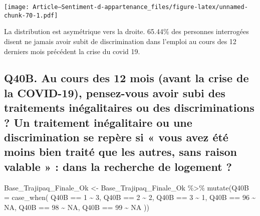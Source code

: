\documentclass[
]{article}
\newenvironment{Shaded}{\begin{snugshade}}{\end{snugshade}}
\newcommand{\AttributeTok}[1]{\textcolor[rgb]{0.77,0.63,0.00}{#1}}
\newcommand{\ConstantTok}[1]{\textcolor[rgb]{0.00,0.00,0.00}{#1}}
\newcommand{\DecValTok}[1]{\textcolor[rgb]{0.00,0.00,0.81}{#1}}
\newcommand{\FunctionTok}[1]{\textcolor[rgb]{0.00,0.00,0.00}{#1}}
\newcommand{\NormalTok}[1]{#1}
\newcommand{\OtherTok}[1]{\textcolor[rgb]{0.56,0.35,0.01}{#1}}
\newcommand{\SpecialCharTok}[1]{\textcolor[rgb]{0.00,0.00,0.00}{#1}}
\begin{document}
\texttt{[image: Article---Sentiment-d-appartenance\_files/figure-latex/unnamed-chunk-70-1.pdf]}

La distribution est asymétrique vers la droite. 65.44\% des personnes
interrogées disent ne jamais avoir subit de discrimination dans l'emploi
au cours des 12 derniers mois précédent la crise du covid 19.

\hypertarget{q40b.-au-cours-des-12-mois-avant-la-crise-de-la-covid-19-pensez-vous-avoir-subi-des-traitements-inuxe9galitaires-ou-des-discriminations-un-traitement-inuxe9galitaire-ou-une-discrimination-se-repuxe8re-si-vous-avez-uxe9tuxe9-moins-bien-traituxe9-que-les-autres-sans-raison-valable-dans-la-recherche-de-logement}{%
\subsection{Q40B. Au cours des 12 mois (avant la crise de la COVID-19),
pensez-vous avoir subi des traitements inégalitaires ou des
discriminations ? Un traitement inégalitaire ou une discrimination se
repère si « vous avez été moins bien traité que les autres, sans raison
valable » : dans la recherche de logement
?}\label{q40b.-au-cours-des-12-mois-avant-la-crise-de-la-covid-19-pensez-vous-avoir-subi-des-traitements-inuxe9galitaires-ou-des-discriminations-un-traitement-inuxe9galitaire-ou-une-discrimination-se-repuxe8re-si-vous-avez-uxe9tuxe9-moins-bien-traituxe9-que-les-autres-sans-raison-valable-dans-la-recherche-de-logement}}

\begin{Shaded}
\begin{Highlighting}[]
\NormalTok{Base\_Trajipaq\_Finale\_Ok }\OtherTok{\textless{}{-}}
\NormalTok{  Base\_Trajipaq\_Finale\_Ok }\SpecialCharTok{\%\textgreater{}\%}
  \FunctionTok{mutate}\NormalTok{(}\AttributeTok{Q40B =} \FunctionTok{case\_when}\NormalTok{(}
\NormalTok{    Q40B }\SpecialCharTok{==} \DecValTok{1} \SpecialCharTok{\textasciitilde{}} \DecValTok{3}\NormalTok{,}
\NormalTok{    Q40B }\SpecialCharTok{==} \DecValTok{2} \SpecialCharTok{\textasciitilde{}} \DecValTok{2}\NormalTok{,}
\NormalTok{    Q40B }\SpecialCharTok{==} \DecValTok{3} \SpecialCharTok{\textasciitilde{}} \DecValTok{1}\NormalTok{,}
\NormalTok{    Q40B }\SpecialCharTok{==} \DecValTok{96} \SpecialCharTok{\textasciitilde{}} \ConstantTok{NA}\NormalTok{,}
\NormalTok{    Q40B }\SpecialCharTok{==} \DecValTok{98} \SpecialCharTok{\textasciitilde{}} \ConstantTok{NA}\NormalTok{,}
\NormalTok{    Q40B }\SpecialCharTok{==} \DecValTok{99} \SpecialCharTok{\textasciitilde{}} \ConstantTok{NA}
\NormalTok{  ))}
\end{Highlighting}
\end{Shaded}
\end{document}
